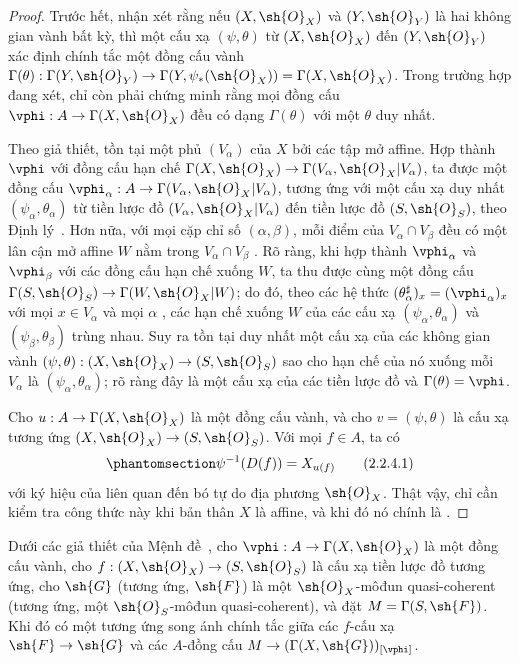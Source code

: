 \documentclass[oneside]{amsart}
\makeatletter
\newcommand{\ega@arrow}[2]{\mathchoice{#1}{#2}{#2}{#2}}
\renewcommand{\to}{\ega@arrow{\longrightarrow}{\rightarrow}}
\newcommand{\oldpage}[2][]{{\marginnote{\normalfont\textbf{#1}~|~#2}}\ignorespaces}
\let\EGAOriginalLabel\label
\renewcommand{\label}[1]{\phantomsection\EGAOriginalLabel{#1}}
\makeatother
\begin{document}
\begin{proof}
Trước hết, nhận xét rằng nếu $(X,\sh{O}_X)$ và $(Y,\sh{O}_Y)$ là hai
không gian vành bất kỳ, thì một cấu xạ $(\psi,\theta)$ từ
$(X,\sh{O}_X)$ đến $(Y,\sh{O}_Y)$ xác định chính tắc một đồng cấu vành
$\Gamma(\theta):\Gamma(Y,\sh{O}_Y)\to
\Gamma(Y,\psi_*(\sh{O}_X))=\Gamma(X,\sh{O}_X)$.
Trong trường hợp đang xét, chỉ còn phải chứng minh rằng mọi đồng cấu
$\vphi:A\to\Gamma(X,\sh{O}_X)$ đều có dạng $\Gamma(\theta)$ với một
$\theta$ duy nhất.

Theo giả thiết, tồn tại một phủ $(V_\alpha)$ của $X$ bởi các tập mở
affine. Hợp thành $\vphi$ với đồng cấu hạn chế
$\Gamma(X,\sh{O}_X)\to\Gamma(V_\alpha,\sh{O}_X|V_\alpha)$, ta được một
đồng cấu
$\vphi_\alpha:A\to\Gamma(V_\alpha,\sh{O}_X|V_\alpha)$, tương ứng với một
cấu xạ duy nhất $(\psi_\alpha,\theta_\alpha)$ từ tiền lược đồ
$(V_\alpha,\sh{O}_X|V_\alpha)$ đến tiền lược đồ $(S,\sh{O}_S)$, theo
Định lý~.
Hơn nữa, với mọi cặp chỉ số $(\alpha,\beta)$, mỗi điểm của
$V_\alpha\cap V_\beta$ đều có một lân cận mở affine $W$ nằm trong
$V_\alpha\cap V_\beta$ . Rõ ràng, khi hợp thành
$\vphi_\alpha$ và $\vphi_\beta$ với các đồng cấu hạn chế xuống $W$, ta
thu được cùng một đồng cấu
$\Gamma(S,\sh{O}_S)\to\Gamma(W,\sh{O}_X|W)$; do đó, theo các hệ thức
$(\theta_\alpha^\sharp)_x=(\vphi_\alpha)_x$ với mọi $x\in V_\alpha$ và
mọi $\alpha$ , các hạn chế xuống $W$ của các cấu xạ
$(\psi_\alpha,\theta_\alpha)$ và $(\psi_\beta,\theta_\beta)$ trùng nhau.
Suy ra tồn tại duy nhất một cấu xạ của các không gian vành
$(\psi,\theta):(X,\sh{O}_X)\to(S,\sh{O}_S)$ sao cho hạn chế của nó xuống
mỗi $V_\alpha$ là $(\psi_\alpha,\theta_\alpha)$; rõ ràng đây là một cấu
xạ của các tiền lược đồ và $\Gamma(\theta)=\vphi$.

Cho $u:A\to\Gamma(X,\sh{O}_X)$ là một đồng cấu vành, và cho
$v=(\psi,\theta)$ là cấu xạ tương ứng
$(X,\sh{O}_X)\to(S,\sh{O}_S)$. Với mọi $f\in A$, ta có
\[
  \label{I.2.2.4.1}
  \psi^{-1}(D(f))=X_{u(f)}
  \tag{2.2.4.1}
\]
với ký hiệu của  liên quan đến bó tự do địa phương
$\sh{O}_X$. Thật vậy, chỉ cần kiểm tra công thức này khi bản thân $X$ là
affine, và khi đó nó chính là .
\end{proof}

\begin{proposition}[2.2.5]
\label{I.2.2.5}
Dưới các giả thiết của Mệnh đề~, cho
$\vphi:A\to\Gamma(X,\sh{O}_X)$ là một đồng cấu vành, cho
$f:(X,\sh{O}_X)\to(S,\sh{O}_S)$ là cấu xạ tiền lược đồ tương ứng,
cho $\sh{G}$ (tương ứng, $\sh{F}$) là một $\sh{O}_X$-môđun quasi-coherent
(tương ứng, một $\sh{O}_S$-môđun quasi-coherent), và đặt
$M=\Gamma(S,\sh{F})$. Khi đó có một tương ứng song ánh chính tắc
\oldpage[I]{100}
giữa các $f$-cấu xạ $\sh{F}\to\sh{G}$  và các
$A$-đồng cấu $M\to(\Gamma(X,\sh{G}))_{[\vphi]}$.
\end{proposition}
\end{document}
